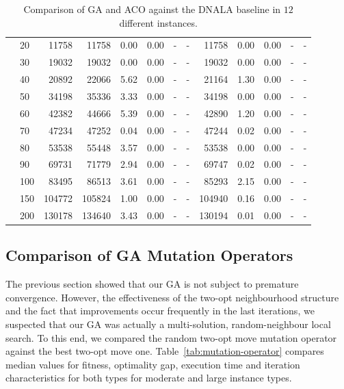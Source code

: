 \documentclass[12pt]{article}
\begin{document}
\begin{table}
{\begin{tabular}{llr|rrrrr|rrrrr}
   & 20  &    11758 &    11758 &   0.00 &   0.00 &          - &                  - &    11758 &  0.00 &   0.00 &          - &                  - \\
   & 30  &    19032 &    19032 &   0.00 &   0.00 &          - &                  - &    19032 &  0.00 &   0.00 &          - &                  - \\
   & 40  &    20892 &    22066 &   5.62 &   0.00 &          - &                  - &    21164 &  1.30 &   0.00 &          - &                  - \\
   & 50  &    34198 &    35336 &   3.33 &   0.00 &          - &                  - &    34198 &  0.00 &   0.00 &          - &                  - \\
   & 60  &    42382 &    44666 &   5.39 &   0.00 &          - &                  - &    42890 &  1.20 &   0.00 &          - &                  - \\
   & 70  &    47234 &    47252 &   0.04 &   0.00 &          - &                  - &    47244 &  0.02 &   0.00 &          - &                  - \\
   & 80  &    53538 &    55448 &   3.57 &   0.00 &          - &                  - &    53538 &  0.00 &   0.00 &          - &                  - \\
   & 90  &    69731 &    71779 &   2.94 &   0.00 &          - &                  - &    69747 &  0.02 &   0.00 &          - &                  - \\
   & 100 &    83495 &    86513 &   3.61 &   0.00 &          - &                  - &    85293 &  2.15 &   0.00 &          - &                  - \\
   & 150 &   104772 &   105824 &   1.00 &   0.00 &          - &                  - &   104940 &  0.16 &   0.00 &          - &                  - \\
   & 200 &   130178 &   134640 &   3.43 &   0.00 &          - &                  - &   130194 &  0.01 &   0.00 &          - &                  - \\

\bottomrule
\end{tabular}%
}
\caption{Comparison of GA and ACO against the DNALA baseline in $12$ different instances.}\label{tab:main}
\end{table}


\subsection{Comparison of GA Mutation Operators}
The previous section showed that our GA is not subject to premature convergence. However, the effectiveness of the two-opt neighbourhood structure and the fact that improvements occur frequently in the last iterations, we suspected that our GA was actually a multi-solution, random-neighbour local search. To this end, we compared the random two-opt move mutation operator against the best two-opt move one. Table~\ref{tab:mutation-operator} compares median values for fitness, optimality gap, execution time and iteration characteristics for both types for moderate and large instance types. 
\end{document}
